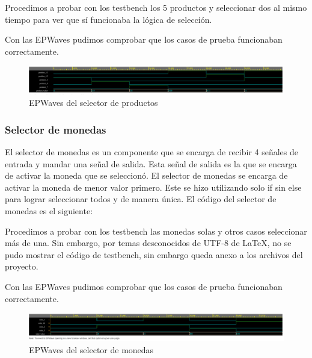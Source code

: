 \documentclass[12pt]{article}  %
\begin{document}


Procedimos a probar con los testbench los 5 productos y seleccionar dos al mismo tiempo para ver que sí funcionaba la lógica de selección.



Con las EPWaves pudimos comprobar que los casos de prueba funcionaban correctamente.

\begin{figure}[!ht]
  \centering
  \caption{EPWaves del selector de productos}
  \includegraphics[width=0.75\linewidth]{Imagenes/EPWaves/product-selector-wave.png}
\end{figure}

\newpage

\subsubsection{Selector de monedas}
El selector de monedas es un componente que se encarga de recibir 4 señales de entrada y mandar una señal de salida. Esta señal de salida es la que se encarga de activar la moneda que se seleccionó. El selector de monedas se encarga de activar la moneda de menor valor primero. Este se hizo utilizando solo if sin else para lograr seleccionar todos y de manera única. El código del selector de monedas es el siguiente:



Procedimos a probar con los testbench las monedas solas y otros casos seleccionar más de una. Sin embargo, por temas desconocidos de UTF-8 de LaTeX, no se pudo mostrar el código de testbench, sin embargo queda anexo a los archivos del proyecto.

Con las EPWaves pudimos comprobar que los casos de prueba funcionaban correctamente.

\begin{figure}[!ht]
  \centering
  \caption{EPWaves del selector de monedas}
  \includegraphics[width=0.75\linewidth]{Imagenes/EPWaves/coin-selector-wave.png}
\end{figure}
\end{document}
